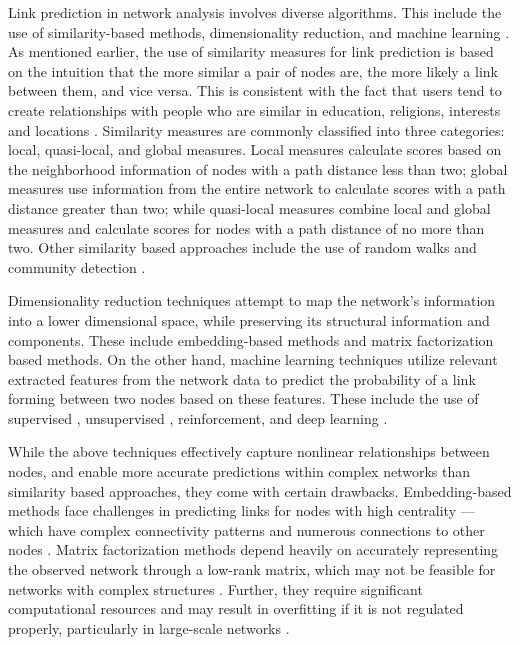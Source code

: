 Link prediction in network analysis involves diverse algorithms. This include the use of similarity-based methods, dimensionality reduction, and machine learning \cite{arrar2023comprehensive}. As mentioned earlier, the use of similarity measures for link prediction is based on the intuition that the more similar a pair of nodes are, the more likely a link between them, and vice versa. This is consistent with the fact that users tend to create relationships with people who are similar in education, religions, interests and locations \cite{wang2014link}. Similarity measures are commonly classified into three categories: local, quasi-local, and global measures. Local measures calculate scores based on the neighborhood information of nodes with a path distance less than two; global measures use information from the entire network to calculate scores with a path distance greater than two; while quasi-local measures combine local and global measures and calculate scores for nodes with a path distance of no more than two. Other similarity based approaches include the use of random walks and community detection \cite{arrar2023comprehensive}.

Dimensionality reduction techniques \cite{coskun2015link} attempt to map the network's information into a lower dimensional space, while preserving its structural information and components. These include embedding-based methods and matrix factorization based methods. On the other hand, machine learning techniques utilize relevant extracted features from the network data to predict the probability of a link forming between two nodes based on these features. These include the use of supervised \cite{kumari2022supervised, abuoda2020link, lichtenwalter2010new}, unsupervised \cite{rossi2021closing}, reinforcement, and deep learning \cite{cui2018survey, arrar2023comprehensive}.

While the above techniques effectively capture nonlinear relationships between nodes, and enable more accurate predictions within complex networks than similarity based approaches, they come with certain drawbacks. Embedding-based methods face challenges in predicting links for nodes with high centrality --- which have complex connectivity patterns and numerous connections to other nodes \cite{arrar2023comprehensive}. Matrix factorization methods depend heavily on accurately representing the observed network through a low-rank matrix, which may not be feasible for networks with complex structures \cite{martinez2016survey, arrar2023comprehensive}. Further, they require significant computational resources and may result in overfitting if it is not regulated properly, particularly in large-scale networks \cite{arrar2023comprehensive}.


